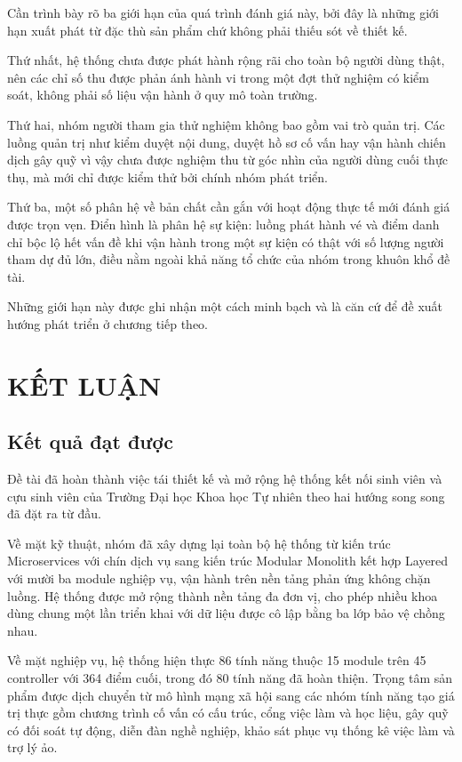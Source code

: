 \documentclass[12pt,a4paper,oneside]{report}
\begin{document}
Cần trình bày rõ ba giới hạn của quá trình đánh giá này, bởi đây là những giới hạn xuất phát từ đặc thù sản phẩm chứ không phải thiếu sót về thiết kế.

Thứ nhất, hệ thống chưa được phát hành rộng rãi cho toàn bộ người dùng thật, nên các chỉ số thu được phản ánh hành vi trong một đợt thử nghiệm có kiểm soát, không phải số liệu vận hành ở quy mô toàn trường.

Thứ hai, nhóm người tham gia thử nghiệm không bao gồm vai trò quản trị. Các luồng quản trị như kiểm duyệt nội dung, duyệt hồ sơ cố vấn hay vận hành chiến dịch gây quỹ vì vậy chưa được nghiệm thu từ góc nhìn của người dùng cuối thực thụ, mà mới chỉ được kiểm thử bởi chính nhóm phát triển.

Thứ ba, một số phân hệ về bản chất cần gắn với hoạt động thực tế mới đánh giá được trọn vẹn. Điển hình là phân hệ sự kiện: luồng phát hành vé và điểm danh chỉ bộc lộ hết vấn đề khi vận hành trong một sự kiện có thật với số lượng người tham dự đủ lớn, điều nằm ngoài khả năng tổ chức của nhóm trong khuôn khổ đề tài.

Những giới hạn này được ghi nhận một cách minh bạch và là căn cứ để đề xuất hướng phát triển ở chương tiếp theo.

\chapter{KẾT LUẬN}

\section{Kết quả đạt được}

Đề tài đã hoàn thành việc tái thiết kế và mở rộng hệ thống kết nối sinh viên và cựu sinh viên của Trường Đại học Khoa học Tự nhiên theo hai hướng song song đã đặt ra từ đầu.

Về mặt kỹ thuật, nhóm đã xây dựng lại toàn bộ hệ thống từ kiến trúc Microservices với chín dịch vụ sang kiến trúc Modular Monolith kết hợp Layered với mười ba module nghiệp vụ, vận hành trên nền tảng phản ứng không chặn luồng. Hệ thống được mở rộng thành nền tảng đa đơn vị, cho phép nhiều khoa dùng chung một lần triển khai với dữ liệu được cô lập bằng ba lớp bảo vệ chồng nhau.

Về mặt nghiệp vụ, hệ thống hiện thực 86 tính năng thuộc 15 module trên 45 controller với 364 điểm cuối, trong đó 80 tính năng đã hoàn thiện. Trọng tâm sản phẩm được dịch chuyển từ mô hình mạng xã hội sang các nhóm tính năng tạo giá trị thực gồm chương trình cố vấn có cấu trúc, cổng việc làm và học liệu, gây quỹ có đối soát tự động, diễn đàn nghề nghiệp, khảo sát phục vụ thống kê việc làm và trợ lý ảo.
\end{document}
